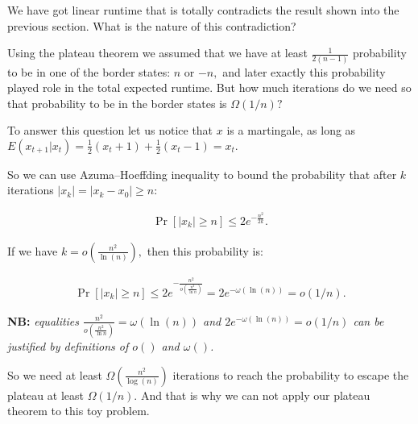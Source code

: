 \documentclass{article}
\begin{document}
We have got linear runtime that is totally contradicts the result shown into the previous section. What is the nature of this contradiction?

Using the plateau theorem we assumed that we have at least $\frac{1}{2(n - 1)}$ probability to be in one of the border states: $n$ or $-n,$ and later exactly this probability played role in the total expected runtime. But how much iterations do we need so that probability to be in the border states is $\Omega(1/n)?$

To answer this question let us notice that $x$ is a martingale, as long as $E(x_{t + 1}|x_t) = \frac{1}{2}(x_t + 1) + \frac{1}{2}(x_t - 1) = x_t.$

So we can use Azuma–Hoeffding inequality to bound the probability that after $k$ iterations $|x_k| = |x_k - x_0| \ge n:$

\begin{align*}
  \Pr[|x_k| \ge n] \le 2e^{-\frac{n^2}{2k}}.
\end{align*}

If we have $k = o\left(\frac{n^2}{\ln(n)}\right),$ then this probability is:

\begin{align*}
  \Pr[|x_k| \ge n] \le 2e^{-\frac{n^2}{o\left(\frac{n^2}{\ln n}\right)}} = 2e^{-\omega(\ln(n))} = o(1/n).
\end{align*}

\textbf{NB:} \textit{equalities $\frac{n^2}{o\left(\frac{n^2}{\ln n}\right)} = \omega(\ln(n))$ and $2e^{-\omega(\ln(n))} = o(1/n)$ can be justified by definitions of $o()$ and $\omega()$.}

So we need at least $\Omega\left(\frac{n^2}{\log(n)}\right)$ iterations to reach the probability to escape the plateau at least $\Omega(1/n).$ And that is why we can not apply our plateau theorem to this toy problem.
\end{document}
